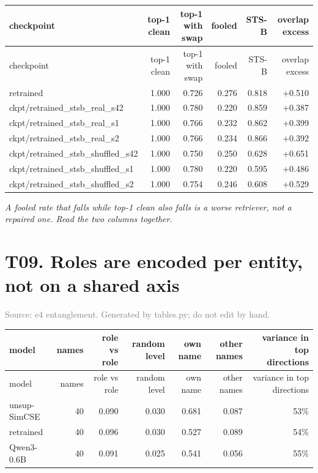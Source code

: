 \documentclass[10pt]{article}
\begin{document}
\footnotesize
\begin{longtable}{>{\raggedright\arraybackslash}p{4.6cm}rrrrr}
\toprule
checkpoint & top-1 clean & top-1 with swap & fooled & STS-B & overlap excess \\
\midrule
\endfirsthead
\toprule
checkpoint & top-1 clean & top-1 with swap & fooled & STS-B & overlap excess \\
\midrule
\endhead
\bottomrule
\endfoot
retrained & 1.000 & 0.726 & 0.276 & 0.818 & +0.510 \\
ckpt/retrained\_stsb\_real\_s42 & 1.000 & 0.780 & 0.220 & 0.859 & +0.387 \\
ckpt/retrained\_stsb\_real\_s1 & 1.000 & 0.766 & 0.232 & 0.862 & +0.399 \\
ckpt/retrained\_stsb\_real\_s2 & 1.000 & 0.766 & 0.234 & 0.866 & +0.392 \\
ckpt/retrained\_stsb\_shuffled\_s42 & 1.000 & 0.750 & 0.250 & 0.628 & +0.651 \\
ckpt/retrained\_stsb\_shuffled\_s1 & 1.000 & 0.780 & 0.220 & 0.595 & +0.486 \\
ckpt/retrained\_stsb\_shuffled\_s2 & 1.000 & 0.754 & 0.246 & 0.608 & +0.529 \\
\end{longtable}
\normalsize

\textit{A fooled rate that falls while top-1 clean also falls is a worse retriever, not a repaired one. Read the two columns together.}
\clearpage

\section*{T09. Roles are encoded per entity, not on a shared axis}
\textcolor{gray}{Source: e4 entanglement. Generated by tables.py; do not edit by hand.}

\footnotesize
\begin{longtable}{lrrrrrr}
\toprule
model & names & role vs role & random level & own name & other names & variance in top directions \\
\midrule
\endfirsthead
\toprule
model & names & role vs role & random level & own name & other names & variance in top directions \\
\midrule
\endhead
\bottomrule
\endfoot
unsup-SimCSE & 40 & 0.090 & 0.030 & 0.681 & 0.087 & 53\% \\
retrained & 40 & 0.096 & 0.030 & 0.527 & 0.089 & 54\% \\
Qwen3-0.6B & 40 & 0.091 & 0.025 & 0.541 & 0.056 & 55\% \\
\end{longtable}
\normalsize
\end{document}
